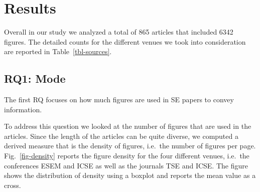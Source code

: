 \documentclass[
  10pt,
  conference,
]{IEEEtran}%
\begin{document}
\section{Results}\label{results}

Overall in our study we analyzed a total of 865 articles that included
6342 figures. The detailed counts for the different venues we took into
consideration are reported in Table~\ref{tbl-sources}.

\begin{table}

\caption{\label{tbl-sources}Summary of articles and figures analyzed}


\end{table}%

\subsection{RQ1: Mode}\label{rq1-mode}

The first RQ focuses on how much figures are used in SE papers to convey
information.

To address this question we looked at the number of figures that are
used in the articles. Since the length of the articles can be quite
diverse, we computed a derived measure that is the density of figures,
i.e.~the number of figures per page. Fig.~\ref{fig-density} reports the
figure density for the four different venues, i.e.~the conferences ESEM
and ICSE as well as the journals TSE and ICSE. The figure shows the
distribution of density using a boxplot and reports the mean value as a
cross.
\end{document}
